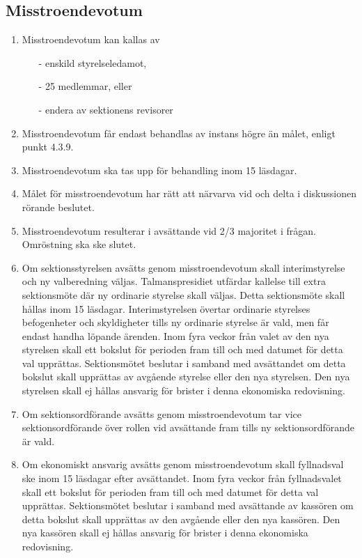 \documentclass[11pt,a4paper]{article}
\begin{document}
\subsection{Misstroendevotum}\label{subsec:misstroende}
\begin{enumerate}[\thesubsection.1]

  \item Misstroendevotum kan kallas av
		\begin{itemize}
			\item[-] enskild styrelseledamot, 
			\item[-] 25 medlemmar, eller
			\item[-] endera av sektionens revisorer
		\end{itemize}
	
	\item Misstroendevotum får endast behandlas av instans högre än målet, enligt punkt 4.3.9. %
	

	\item Misstroendevotum ska tas upp för behandling inom 15 läsdagar.

	\item Målet för misstroendevotum har rätt att närvarva vid och delta i diskussionen rörande beslutet.

	\item Misstroendevotum resulterar i avsättande vid 2/3 majoritet i frågan. Omröstning ska ske slutet. 

	\item Om sektionsstyrelsen avsätts genom misstroendevotum skall interimstyrelse och ny valberedning väljas. Talmanspresidiet utfärdar kallelse till extra sektionsmöte där ny ordinarie styrelse skall väljas. Detta sektionsmöte skall hållas inom 15 läsdagar. Interimstyrelsen övertar ordinarie styrelses befogenheter och skyldigheter tills ny ordinarie styrelse är vald, men får endast handha löpande ärenden. Inom fyra veckor från valet av den nya styrelsen skall ett bokslut för perioden fram till och med datumet för detta val upprättas. Sektionsmötet beslutar i samband med avsättandet om detta bokslut skall upprättas av avgående styrelse eller den nya styrelsen. Den nya styrelsen skall ej hållas ansvarig för brister i denna ekonomiska redovisning.

	\item Om sektionsordförande avsätts genom misstroendevotum tar vice sektionsordförande över rollen vid avsättande fram tills ny sektionsordförande är vald.

	\item Om ekonomiskt ansvarig avsätts genom misstroendevotum skall fyllnadsval ske inom 15 läsdagar efter avsättandet. Inom fyra veckor från fyllnadsvalet skall ett bokslut för perioden fram till och med datumet för detta val upprättas. Sektionsmötet beslutar i samband med avsättande av kassören om detta bokslut skall upprättas av den avgående eller den nya kassören. Den nya kassören skall ej hållas  ansvarig för brister i denna ekonomiska redovisning. 


\end{enumerate}
\end{document}
